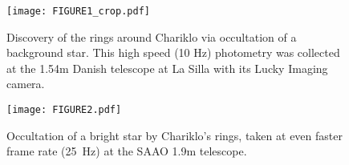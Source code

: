 \documentclass{pasa}%
\begin{document}
\begin{figure}
\begin{center}
   \texttt{[image: FIGURE1\_crop.pdf]} 
\end{center}
   \caption{Discovery of the rings around Chariklo via occultation of a background star. This high speed (10 Hz) photometry was collected at the 1.54m Danish telescope at La Silla with its Lucky Imaging camera.}
   \label{fig:chariklo-lc}
\end{figure}

\begin{figure}
   \centering
   \texttt{[image: FIGURE2.pdf]} 
   \caption{Occultation of a bright star by Chariklo's rings, taken at even faster frame rate (25~Hz) at the SAAO 1.9m telescope.}
   \label{fig:lc-highspeed}
\end{figure}
\end{document}
